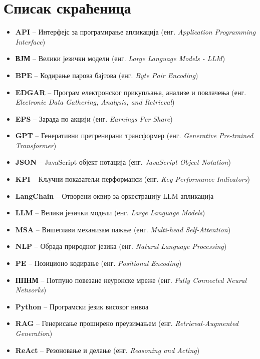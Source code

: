 \cleardoublepage
\chapter*{Списак скраћеница}

\begin{itemize}
    \item \textbf{API} -- Интерфејс за програмирање апликација (енг. \textit{Application Programming Interface})
    \item \textbf{ВЈМ} -- Велики језички модели (енг. \textit{Large Language Models - LLM})
    \item \textbf{BPE} -- Кодирање парова бајтова (енг. \textit{Byte Pair Encoding})
    \item \textbf{EDGAR} -- Програм електронског прикупљања, анализе и повлачења (енг. \textit{Electronic Data Gathering, Analysis, and Retrieval})
    \item \textbf{EPS} -- Зарада по акцији (енг. \textit{Earnings Per Share})
    \item \textbf{GPT} -- Генеративни претренирани трансформер (енг. \textit{Generative Pre-trained Transformer})
    \item \textbf{JSON} -- JavaScript објект нотација (енг. \textit{JavaScript Object Notation})
    \item \textbf{KPI} -- Кључни показатељи перформанси (енг. \textit{Key Performance Indicators})
    \item \textbf{LangChain} -- Отворени оквир за оркестрацију LLM апликација
    \item \textbf{LLM} -- Велики језички модели (енг. \textit{Large Language Models})
    \item \textbf{MSA} -- Вишеглави механизам пажње (енг. \textit{Multi-head Self-Attention})
    \item \textbf{NLP} -- Обрада природног језика (енг. \textit{Natural Language Processing})
    \item \textbf{PE} -- Позиционо кодирање (енг. \textit{Positional Encoding})
    \item \textbf{ППНМ} -- Потпуно повезане неуронске мреже (енг. \textit{Fully Connected Neural Networks})
    \item \textbf{Python} -- Програмски језик високог нивоа
    \item \textbf{RAG} -- Генерисање проширено преузимањем (енг. \textit{Retrieval-Augmented Generation})
    \item \textbf{ReAct} -- Резоновање и делање (енг. \textit{Reasoning and Acting})

\end{itemize}
